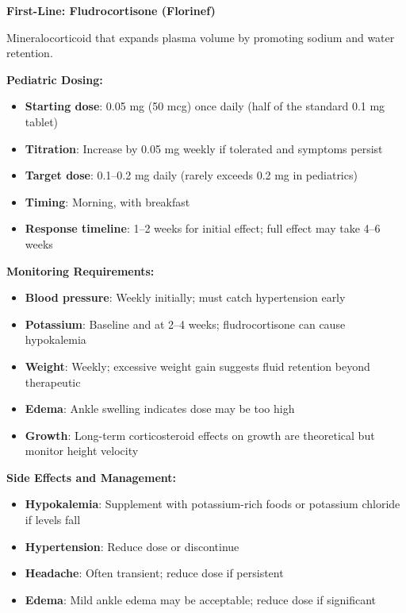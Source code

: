 \begin{protocol}
\label{protocol:ped-oi-pharm}

\textbf{First-Line: Fludrocortisone (Florinef)}

Mineralocorticoid that expands plasma volume by promoting sodium and water retention.

\textbf{Pediatric Dosing:}
\begin{itemize}
    \item \textbf{Starting dose}: 0.05 mg (50 mcg) once daily (half of the standard 0.1 mg tablet)
    \item \textbf{Titration}: Increase by 0.05 mg weekly if tolerated and symptoms persist
    \item \textbf{Target dose}: 0.1--0.2 mg daily (rarely exceeds 0.2 mg in pediatrics)
    \item \textbf{Timing}: Morning, with breakfast
    \item \textbf{Response timeline}: 1--2 weeks for initial effect; full effect may take 4--6 weeks
\end{itemize}

\textbf{Monitoring Requirements:}
\begin{itemize}
    \item \textbf{Blood pressure}: Weekly initially; must catch hypertension early
    \item \textbf{Potassium}: Baseline and at 2--4 weeks; fludrocortisone can cause hypokalemia
    \item \textbf{Weight}: Weekly; excessive weight gain suggests fluid retention beyond therapeutic
    \item \textbf{Edema}: Ankle swelling indicates dose may be too high
    \item \textbf{Growth}: Long-term corticosteroid effects on growth are theoretical but monitor height velocity
\end{itemize}

\textbf{Side Effects and Management:}
\begin{itemize}
    \item \textbf{Hypokalemia}: Supplement with potassium-rich foods or potassium chloride if levels fall
    \item \textbf{Hypertension}: Reduce dose or discontinue
    \item \textbf{Headache}: Often transient; reduce dose if persistent
    \item \textbf{Edema}: Mild ankle edema may be acceptable; reduce dose if significant
\end{itemize}


\end{protocol}
